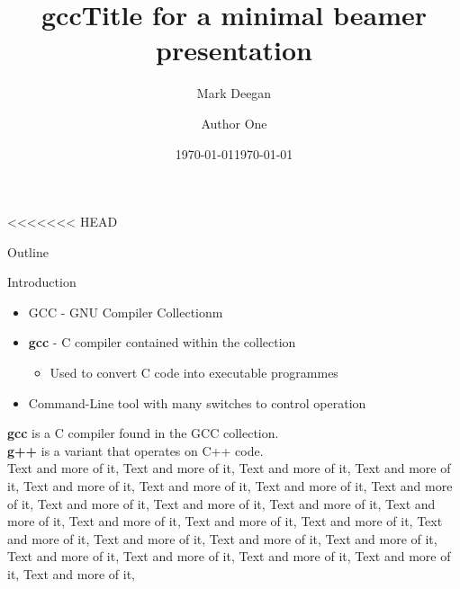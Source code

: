 \documentclass{beamer}
\title{\textbf{gcc}}
\author{Mark Deegan}
\institute{TU Dublin}
\date{\today}
\title{Title for a minimal beamer presentation}	%
\author{Author One}								%
\institute{Name of institution}					%
\date{\today}									%
\begin{document}
<<<<<<< HEAD
\begin{frame}
    \maketitle
\end{frame}

\begin{frame}{Outline}
    \tableofcontents
\end{frame}

\begin{frame}[allowframebreaks]{Introduction}
    \begin{itemize}
        \item GCC - GNU Compiler Collectionm
        \item \textbf{gcc} - C compiler contained within the collection
        \begin{itemize}
            \item Used to convert C code into executable programmes
        \end{itemize}
        \item Command-Line tool with many switches to control operation
    \end{itemize}
    \textbf{gcc} is a C compiler found in the GCC collection.
    \\
    \textbf{g++} is a variant that operates on C++ code.
    \\
    \framebreak
    Text and more of it, Text and more of it, Text and more of it, Text and more of it, Text and more of it, Text and more of it, Text and more of it, Text and more of it, Text and more of it, Text and more of it, Text and more of it, Text and more of it, Text and more of it, \framebreak
    Text and more of it, Text and more of it, Text and more of it, Text and more of it, Text and more of it, Text and more of it, Text and more of it, Text and more of it, Text and more of it, Text and more of it, Text and more of it, 
\end{frame}
\end{document}

